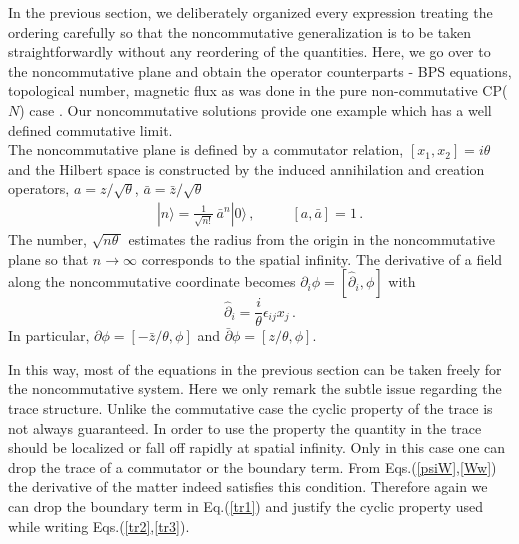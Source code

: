 \documentclass[a4paper,12pt]{article}
\begin{document}
In the previous section, we deliberately organized every expression treating the ordering carefully so that the
noncommutative generalization is to be taken straightforwardly without any reordering of the quantities. Here, we
go over to the noncommutative plane and obtain the operator counterparts - BPS equations, topological number,
magnetic flux as was done in the pure non-commutative CP($N$) case \cite{yang}. Our noncommutative solutions provide one example which has a well defined
commutative limit.\\

The noncommutative plane is defined by a
commutator relation, $[x_{1},x_{2}]=i\theta$ and the Hilbert space is
constructed by the induced  annihilation and creation operators,
$a=z/\sqrt{\theta}$, $\bar{a}=\bar{z}/\sqrt{\theta}$
\begin{equation}
\begin{array}{ll}
|n\rangle=\displaystyle{\frac{1}{\sqrt{n!}}}\,\bar{a}^{n}|0\rangle\,,~~~~&~~~~[a,\bar{a}]=1\,.
\end{array}
\end{equation}
The number, $\sqrt{n\theta\,}$ estimates the radius from the origin in the
noncommutative plane so that $n\rightarrow\infty$ corresponds to the spatial
infinity.  The derivative of a field along the noncommutative coordinate
becomes  $\partial_{i}\phi=[\hat{\partial}_{i},\phi]$ with
\begin{equation}
\hat{\partial}_{i}=\displaystyle{\frac{i}{\theta}}\epsilon_{ij}x_{j}\,.
\end{equation}
In particular, $\partial\phi=[-\bar{z}/\theta,\phi]$ and
$\bar{\partial}\phi=[z/\theta,\phi]$.\newline

In this way, most of  the equations in the previous section can be taken freely for the noncommutative system.
Here we only remark the   subtle issue regarding the trace structure.  Unlike the commutative case the cyclic
property of the trace is not always guaranteed. In order to use the property the quantity in the trace should be
localized or fall off rapidly at spatial infinity. Only in this case one can drop the trace of a commutator or the
boundary term.  From Eqs.(\ref{psiW},\ref{Ww}) the derivative of the matter indeed satisfies this condition.
Therefore  again we can drop the boundary term in Eq.(\ref{tr1}) and justify the cyclic property used  while writing
Eqs.(\ref{tr2},\ref{tr3}).\\
\end{document}
